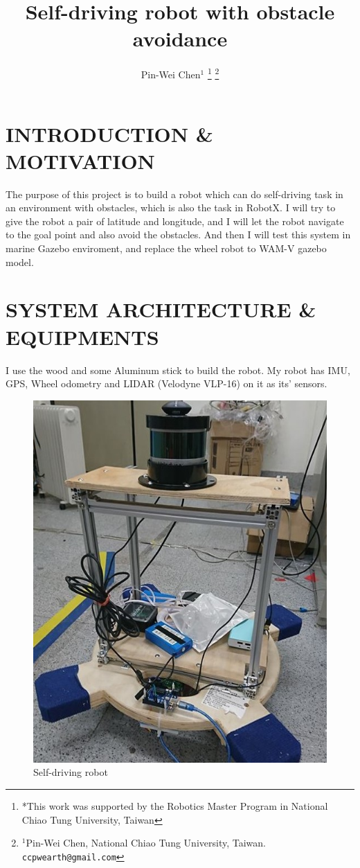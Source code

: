 \documentclass[letterpaper, 10 pt, conference]{ieeeconf}  %
\title{\LARGE \bf
Self-driving robot with obstacle avoidance
}
\author{Pin-Wei Chen$^{1}$%
\thanks{*This work was supported by the Robotics Master Program in National Chiao Tung University, Taiwan}%
\thanks{$^{1}$Pin-Wei Chen, National Chiao Tung University, Taiwan.		{\tt\small ccpwearth@gmail.com}}%
}
\begin{document}
\maketitle
\thispagestyle{empty}
\pagestyle{empty}


\section{INTRODUCTION \& MOTIVATION}

The purpose of this project is to build a robot which can do self-driving task in an environment with obstacles, which is also the task in RobotX. I will try to give the robot a pair of latitude and longitude, and I will let the robot navigate to the goal point and also avoid the obstacles. And then I will test this system in marine Gazebo enviroment, and replace the wheel robot to WAM-V gazebo model.

\section{SYSTEM ARCHITECTURE \& EQUIPMENTS}

I use the wood and some Aluminum stick to build the robot. My robot has IMU, GPS, Wheel odometry and LIDAR (Velodyne VLP-16) on it as its' sensors.


\begin{figure}[h] %
\includegraphics[width=0.8\columnwidth]{robot}
\centering
\caption{Self-driving robot}
\label{figure:robot}
\end{figure}
\end{document}
